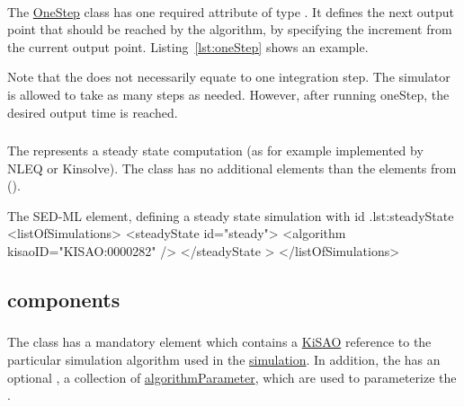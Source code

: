 \paragraph*{}
\label{sec:step}
The \hyperref[class:oneStep]{OneStep} class has one required attribute  of type . It defines the next output point that should be reached by the algorithm, by specifying the increment from the current output point. Listing~\ref{lst:oneStep} shows an example. 

Note that the  does not necessarily equate to one integration step. The simulator is allowed to take as many steps as needed. However, after running oneStep, the desired output time is reached.


\subsubsection{}
\label{class:steadyState}
The  represents a steady state computation (as for example implemented by NLEQ or Kinsolve). The  class has no additional elements than the elements from \Simulation ().


\begin{myXmlLst}{The SED-ML  element, defining a steady state simulation with id .}{lst:steadyState}
<listOfSimulations>
	<steadyState id="steady"> 
		<algorithm kisaoID="KISAO:0000282" />
	</steadyState > 
</listOfSimulations>
\end{myXmlLst}


\subsection{ components}
\label{class:simulationComponents}

\subsubsection{}
\label{class:algorithm}
The  class has a mandatory element \hyperref[sec:kisaoid]{} which contains a \hyperref[sec:kisao]{KiSAO} reference to the particular simulation algorithm used in the \hyperref[class:simulation]{simulation}. In addition, the  has an optional \hyperref[class:listOfAlgorithmParameters]{}, a collection of \hyperref[class:algorithmParameter]{algorithmParameter}, which are used to parameterize the .

